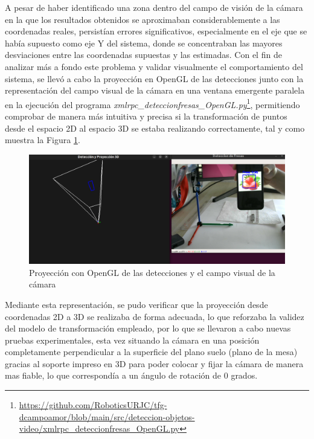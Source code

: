 A pesar de haber identificado una zona dentro del campo de visión de la cámara en la que los resultados obtenidos se aproximaban considerablemente a las coordenadas reales, persistían errores significativos, especialmente en el eje que se había supuesto como eje Y del sistema, donde se concentraban las mayores desviaciones entre las coordenadas supuestas y las estimadas. Con el fin de analizar más a fondo este problema y validar visualmente el comportamiento del sistema, se llevó a cabo la proyección en OpenGL de las detecciones junto con la representación del campo visual de la cámara en una ventana emergente paralela en la ejecución del programa \textit{xmlrpc\_deteccionfresas\_OpenGL.py}\footnote{\url{https://github.com/RoboticsURJC/tfg-dcampoamor/blob/main/src/deteccion-objetos-video/xmlrpc_deteccionfresas_OpenGL.py}}, permitiendo comprobar de manera más intuitiva y precisa si la transformación de puntos desde el espacio 2D al espacio 3D se estaba realizando correctamente, tal y como muestra la Figura \ref{fig:proy_OpenGL_deteccion}.

   \begin{figure}[H]
    \centering
    \begin{center}
      \includegraphics[width=140mm]{figs/Proyeccion plano mesa OpenGL con ejes coordenadas_2.png}
    \end{center}
    \caption{Proyección con OpenGL de las detecciones y el campo visual de la cámara}
    \label{fig:proy_OpenGL_deteccion}
  \end{figure}

Mediante esta representación, se pudo verificar que la proyección desde coordenadas 2D a 3D se realizaba de forma adecuada, lo que reforzaba la validez del modelo de transformación empleado, por lo que se llevaron a cabo nuevas pruebas experimentales, esta vez situando la cámara en una posición completamente perpendicular a la superficie del plano suelo (plano de la mesa) gracias al soporte impreso en 3D para poder colocar y fijar la cámara de manera mas fiable, lo que correspondía a un ángulo de rotación de 0 grados. \\

